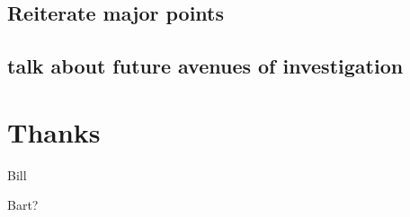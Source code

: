 \documentclass[10pt,]{article} %
\begin{document}
\subsection{Reiterate major points}

\subsection{talk about future avenues of investigation}


\section{Thanks}


	Bill

	Bart?





\end{document}
